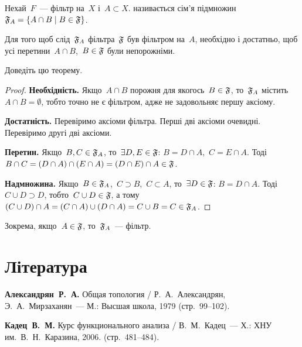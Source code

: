\begin{definition}
    Нехай~$F$~--- фільтр на~$X$ і~$A \subset X$.  називається сім'я підмножин~$\frak F_A = \{ A \cap B \mid B \in \frak F\}$.
\end{definition}

\begin{theorem}
    \label{th:filter-restriction-criterion}
    Для того щоб слід~$\frak F_A$ фільтра~$\frak F$ був фільтром на~$A$, необхідно і достатньо, щоб усі перетини~$A \cap B$,~$B \in \frak F$ були непорожніми.
\end{theorem}

\begin{exercise}
    Доведіть цю теорему.
\end{exercise}
\begin{proof}
    \textbf{Необхідність.} Якщо~$A \cap B$ порожня для якогось~$B \in \frak F$, то~$\frak F_A$ містить~$A \cap B = \emptyset$, тобто точно не є фільтром, адже не задовольняє першу аксіому. 
    
    \textbf{Достатність.} Перевіримо аксіоми фільтра. Перші дві аксіоми очевидні. Перевіримо другі дві аксіоми. 
    
    \textbf{Перетин.} Якщо~$B, C \in \frak F_A$, то~$\exists D, E \in \frak F$: $B = D \cap A$,~$C = E \cap A$. Тоді~$B \cap C = (D \cap A) \cap (E \cap A) = (D \cap E) \cap A \in \frak F$. 
    
    \textbf{Надмножина.} Якщо~$B \in \frak F_A$,~$C \supset B$,~$C \subset A$, то~$\exists D \in \frak F$: $B = D \cap A$. Тоді~$C \cup D \supset D$, тобто~$C \cup D \in \frak F$, а тому~$(C \cup D) \cap A = (C \cap A) \cup (D \cap A) = C \cup B = C \in \frak F_A$.
\end{proof}

\begin{corollary}
    Зокрема, якщо~$A \in \frak F$, то~$\frak F_A$~--- фільтр.
\end{corollary}

\section{Література}

\begin{enumerate}[label={[\arabic*]}]
\item \textbf{Александрян~Р.~А.}
Общая топология /
Р.~А.~Александрян, Э.~А.~Мирзаханян~---
М.: Высшая школа, 1979 (стр.~99--102).
\item \textbf{Кадец~В.~М.}
Курс функционального анализа /
В.~М.~Кадец~---
Х.: ХНУ им.~В.~Н.~Каразина, 2006. (стр.~481--484).
\end{enumerate}
